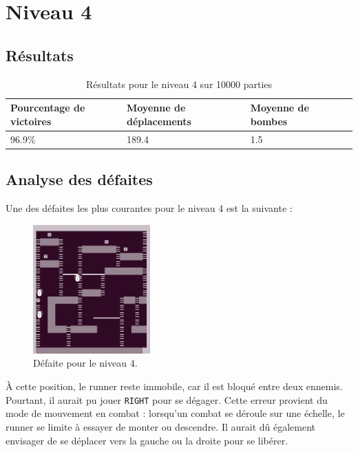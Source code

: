 \newpage

\section{Niveau 4}

\subsection{Résultats}

\begin{table}[!htpb]
    \begin{tabularx}{\textwidth}{lXXX}
        \toprule
        Pourcentage de victoires & Moyenne de déplacements & Moyenne de bombes \\
        \midrule
        96.9\% & 189.4 & 1.5 \\
        \bottomrule
    \end{tabularx}
    \caption{Résultats pour le niveau 4 sur 10000 parties}
    \label{tab:res-niveau-4}
\end{table}

\subsection{Analyse des défaites}

Une des défaites les plus courantes pour le niveau 4 est la suivante :

\begin{figure}[!htpb]
    \centering
    \includegraphics[width=0.4\textwidth]{Figures/level4-over.png}
    \caption{Défaite pour le niveau 4.}
    \label{fig:defaite-niveau-4}
\end{figure}

À cette position, le runner reste immobile, car il est bloqué entre deux ennemis.
Pourtant, il aurait pu jouer \texttt{RIGHT} pour se dégager.
\newline
Cette erreur provient du mode de mouvement en combat : lorsqu'un combat se déroule sur une échelle, le runner se limite à essayer de monter ou descendre.
Il aurait dû également envisager de se déplacer vers la gauche ou la droite pour se libérer.

